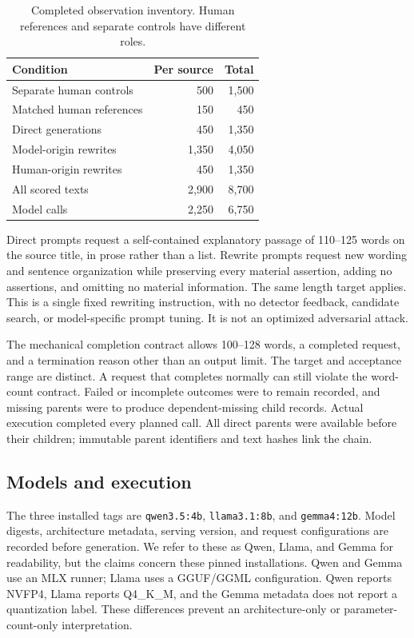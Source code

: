 \begin{table}[t]
\centering
\caption{Completed observation inventory. Human references and separate controls have different roles.}
\label{tab:inventory}
\begin{tabular}{lrr}
\toprule
Condition & Per source & Total\\
\midrule
Separate human controls & 500 & 1,500\\
Matched human references & 150 & 450\\
Direct generations & 450 & 1,350\\
Model-origin rewrites & 1,350 & 4,050\\
Human-origin rewrites & 450 & 1,350\\
\midrule
All scored texts & 2,900 & 8,700\\
Model calls & 2,250 & 6,750\\
\bottomrule
\end{tabular}
\end{table}

Direct prompts request a self-contained explanatory passage of 110--125 words on the source title, in prose rather than a list. Rewrite prompts request new wording and sentence organization while preserving every material assertion, adding no assertions, and omitting no material information. The same length target applies. This is a single fixed rewriting instruction, with no detector feedback, candidate search, or model-specific prompt tuning. It is not an optimized adversarial attack.

The mechanical completion contract allows 100--128 words, a completed request, and a termination reason other than an output limit. The target and acceptance range are distinct. A request that completes normally can still violate the word-count contract. Failed or incomplete outcomes were to remain recorded, and missing parents were to produce dependent-missing child records. Actual execution completed every planned call. All direct parents were available before their children; immutable parent identifiers and text hashes link the chain.

\subsection{Models and execution}
The three installed tags are \texttt{qwen3.5:4b}, \texttt{llama3.1:8b}, and \texttt{gemma4:12b}. Model digests, architecture metadata, serving version, and request configurations are recorded before generation. We refer to these as Qwen, Llama, and Gemma for readability, but the claims concern these pinned installations. Qwen and Gemma use an MLX runner; Llama uses a GGUF/GGML configuration. Qwen reports NVFP4, Llama reports Q4\_K\_M, and the Gemma metadata does not report a quantization label. These differences prevent an architecture-only or parameter-count-only interpretation.

